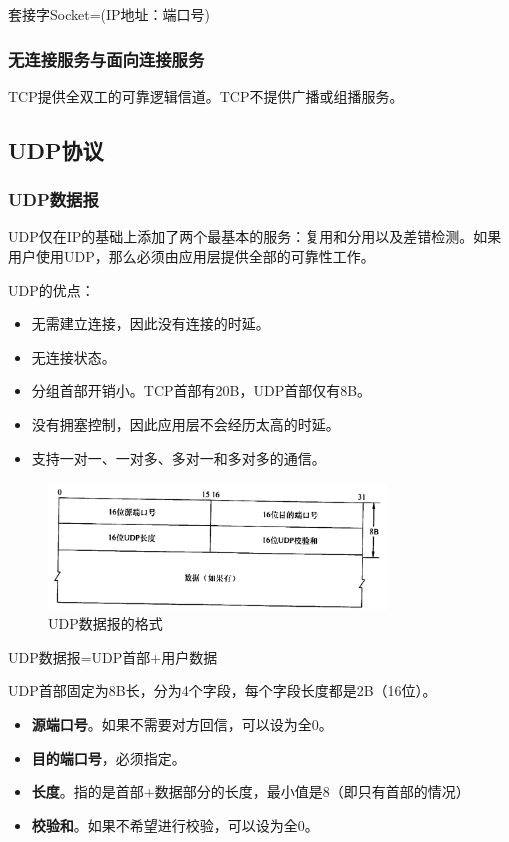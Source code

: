 \documentclass[12pt, a4paper, oneside]{ctexart}
\begin{document}
套接字Socket=(IP地址：端口号)

\subsubsection{无连接服务与面向连接服务}

TCP提供全双工的可靠逻辑信道。TCP不提供广播或组播服务。

\subsection{UDP协议}

\subsubsection{UDP数据报}

UDP仅在IP的基础上添加了两个最基本的服务：复用和分用以及差错检测。如果用户使用UDP，那么必须由应用层提供全部的可靠性工作。

UDP的优点：
\begin{itemize}
    \item 无需建立连接，因此没有连接的时延。
    \item 无连接状态。
    \item 分组首部开销小。TCP首部有20B，UDP首部仅有8B。
    \item 没有拥塞控制，因此应用层不会经历太高的时延。
    \item 支持一对一、一对多、多对一和多对多的通信。
\end{itemize}

\begin{figure}[h]
    \centering
    \includegraphics[width=0.8\textwidth]{./images/udp_header.png}
    \caption{UDP数据报的格式}
\end{figure}

UDP数据报=UDP首部+用户数据

UDP首部固定为8B长，分为4个字段，每个字段长度都是2B（16位）。
\begin{itemize}
    \item {\bf 源端口号}。如果不需要对方回信，可以设为全0。
    \item {\bf 目的端口号}，必须指定。
    \item {\bf 长度}。指的是首部+数据部分的长度，最小值是8（即只有首部的情况）
    \item {\bf 校验和}。如果不希望进行校验，可以设为全0。
\end{itemize}
\end{document}
